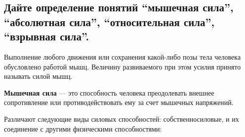 \subsection{Дайте определение понятий ``мышечная сила'', ``абсолютная сила'', ``относительная сила'', ``взрывная сила''.}

Выполнение любого движения или сохранения какой-либо позы тела человека обусловлено работой мышц. Величину развиваемого при
этом усилия принято называть силой мышц.

\textbf{Мышечная сила} --- это способность человека преодолевать внешнее сопротивление или противодействовать ему за счет мышечных
напряжений.

Различают следующие виды силовых способностей: собственносиловые, и их соединение с другими физическими способностями:

